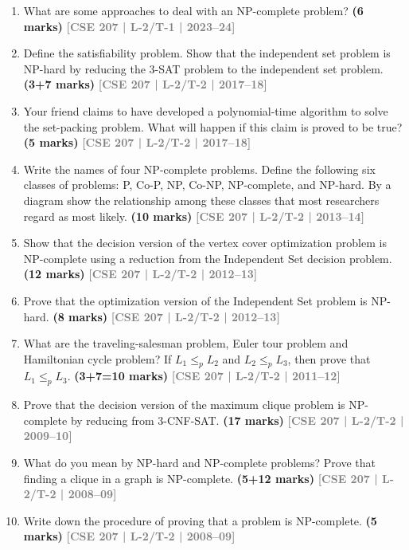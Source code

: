 \documentclass[12pt]{article}
\newcommand{\yr}[1]{\hfill\textcolor{gray}{\small\textbf{[#1]}}}
\newcommand{\mk}[1]{\textcolor{orange!70!black}{\small\textbf{(#1 marks)}}}
\begin{document}
\begin{enumerate}

\item What are some approaches to deal with an NP-complete problem?
\mk{6} \yr{CSE 207 | L-2/T-1 | 2023--24}


\item Define the satisfiability problem. Show that the independent set problem is NP-hard by reducing the 3-SAT problem to the independent set problem. \mk{3+7}
\yr{CSE 207 | L-2/T-2 | 2017--18}


\item Your friend claims to have developed a polynomial-time algorithm to solve the set-packing problem. What will happen if this claim is proved to be true? \mk{5}
\yr{CSE 207 | L-2/T-2 | 2017--18}


\item Write the names of four NP-complete problems. Define the following six classes of problems: P, Co-P, NP, Co-NP, NP-complete, and NP-hard. By a diagram show the relationship among these classes that most researchers regard as most likely.
\mk{10} \yr{CSE 207 | L-2/T-2 | 2013--14}


\item Show that the decision version of the vertex cover optimization problem is NP-complete using a reduction from the Independent Set decision problem. \mk{12}
\yr{CSE 207 | L-2/T-2 | 2012--13}


\item Prove that the optimization version of the Independent Set problem is NP-hard. \mk{8}
\yr{CSE 207 | L-2/T-2 | 2012--13}


\item What are the traveling-salesman problem, Euler tour problem and Hamiltonian cycle problem? If $L_1 \leq_p L_2$ and $L_2 \leq_p L_3$, then prove that $L_1 \leq_p L_3$. \mk{3+7=10}
\yr{CSE 207 | L-2/T-2 | 2011--12}


\item Prove that the decision version of the maximum clique problem is NP-complete by reducing from 3-CNF-SAT. \mk{17}
\yr{CSE 207 | L-2/T-2 | 2009--10}


\item What do you mean by NP-hard and NP-complete problems? Prove that finding a clique in a graph is NP-complete. \mk{5+12}
\yr{CSE 207 | L-2/T-2 | 2008--09}


\item Write down the procedure of proving that a problem is NP-complete. \mk{5}
\yr{CSE 207 | L-2/T-2 | 2008--09}



\end{enumerate}
\end{document}
